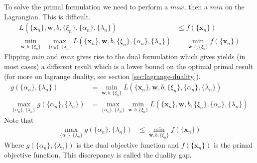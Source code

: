 \documentclass[11pt]{article}
\newcommand{\vct}[1]{\boldsymbol{#1}} %
\begin{document}
To solve the primal formulation we need to perform a $max$, then a $min$ on the Lagrangian. This is difficult.
\begin{align*}
L(\{\vct{x}_{n}\},\vct{w}, b, \{\xi_{n}\}, \{\alpha_{n}\}, \{\lambda_{n}\}) &\le f(\{\vct{x}_{n}\})\\
\min_{\vct{w}, b, \{\xi_{n}\}}  \;\;\max_{ \{\alpha_{n}\} , \{\lambda_{n}\}} L(\{\vct{x}_{n}\},\vct{w}, b, \{\xi_{n}\}, \{\alpha_{n}\}, \{\lambda_{n}\}) &= \min_{\vct{w}, b, \{\xi_{n}\}}f(\{\vct{x}_{n}\})
\end{align*}
Flipping $min$ and $max$ gives rise to the dual formulation which gives yields (in most cases) a different result which is a lower bound on the optimal primal result (for more on lagrange duality, see section \ref{sec:lagrange-duality}).
\begin{align*}
g( \{\alpha_{n}\}, \{\lambda_{n}\}) &= \min_{\vct{w}, b, \{\xi_{n}\}}  L(\{\vct{x}_{n}\},\vct{w}, b, \{\xi_{n}\}, \{\alpha_{n}\}, \{\lambda_{n}\})\\
 \max_{ \{\alpha_{n}\} , \{\lambda_{n}\}}g( \{\alpha_{n}\}, \{\lambda_{n}\}) &=  \max_{ \{\alpha_{n}\} , \{\lambda_{n}\}} \min_{\vct{w}, b, \{\xi_{n}\}}  L(\{\vct{x}_{n}\},\vct{w}, b, \{\xi_{n}\}, \{\alpha_{n}\}, \{\lambda_{n}\})
\end{align*}
Note that 
\begin{align*}
 \max_{ \{\alpha_{n}\} , \{\lambda_{n}\}}g( \{\alpha_{n}\}, \{\lambda_{n}\}) &\le  \min_{\vct{w}, b, \{\xi_{n}\}} f(\{\vct{x}_{n}\})
\end{align*}
Where $g( \{\alpha_{n}\}, \{\lambda_{n}\})$ is the dual objective function and $f(\{\vct{x}_{n}\})$ is the primal objective function. This discrepancy is called the duality gap.
\end{document}
